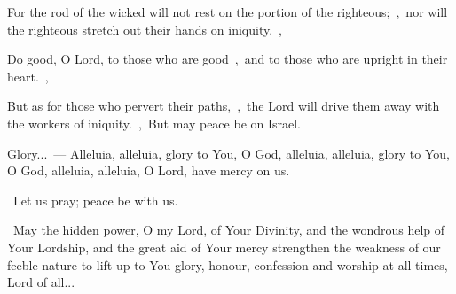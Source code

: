 \documentclass[12pt,twoside,a5paper]{article}
\begin{document}
\begin{halfparskip}
  For the rod of the wicked will not rest on the portion of the righteous;~\sep\ nor will the righteous stretch out their hands on iniquity.~\sep

  Do good, O Lord, to those who are good~\sep\ and to those who are upright in their heart.~\sep

  But as for those who pervert their paths,~\sep\ the Lord will drive them away with the workers of iniquity.~\sep\ But may peace be on Israel.

  Glory...~--- Alleluia, alleluia, glory to You, O God, alleluia, alleluia, glory to You, O God, alleluia, alleluia, O Lord, have mercy on us.
\end{halfparskip}

\dd~Let us pray; peace be with us.

\cc~May the hidden power, O my Lord, of Your Divinity, and the wondrous help of Your Lordship, and the great aid of Your mercy strengthen the weakness of our feeble nature to lift up to You glory, honour, confession and worship at all times, Lord of all...


\end{document}
